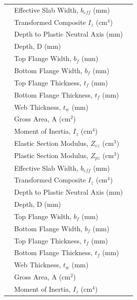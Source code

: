 \documentclass[12pt,a4paper]{report}
\numberwithin{table}{chapter}
\numberwithin{figure}{chapter}
\begin{document}
\begin{longtable}{|C{2.5cm}|L{8.0cm}|>{\centering\arraybackslash}p{5.0cm}|}
 & \textnormal{Effective Slab Width, $b_{eff}$ (mm)} &  \\[6pt]
 & \textnormal{Transformed Composite $I_z$ (cm$^4$)} &  \\[6pt]
 & \textnormal{Depth to Plastic Neutral Axis (mm)} &  \\[6pt]
\hline
{} & \textnormal{Depth, D (mm)} &  \\[6pt]
 & \textnormal{Top Flange Width, $b_f$ (mm)} &  \\[6pt]
 & \textnormal{Bottom Flange Width, $b_f$ (mm)} &  \\[6pt]
 & \textnormal{Top Flange Thickness, $t_f$ (mm)} &  \\[6pt]
 & \textnormal{Bottom Flange Thickness, $t_f$ (mm)} &  \\[6pt]
 & \textnormal{Web Thickness, $t_w$ (mm)} &  \\[6pt]
 & \textnormal{Gross Area, A (cm$^2$)} &  \\[6pt]
 & \textnormal{Moment of Inertia, $I_z$ (cm$^4$)} &  \\[6pt]
 & \textnormal{Elastic Section Modulus, $Z_{ez}$ (cm$^3$)} &  \\[6pt]
 & \textnormal{Plastic Section Modulus, $Z_{pz}$ (cm$^3$)} &  \\[6pt]
 & \textnormal{Effective Slab Width, $b_{eff}$ (mm)} &  \\[6pt]
 & \textnormal{Transformed Composite $I_z$ (cm$^4$)} &  \\[6pt]
 & \textnormal{Depth to Plastic Neutral Axis (mm)} &  \\[6pt]
\hline
{} & \textnormal{Depth, D (mm)} &  \\[6pt]
 & \textnormal{Top Flange Width, $b_f$ (mm)} &  \\[6pt]
 & \textnormal{Bottom Flange Width, $b_f$ (mm)} &  \\[6pt]
 & \textnormal{Top Flange Thickness, $t_f$ (mm)} &  \\[6pt]
 & \textnormal{Bottom Flange Thickness, $t_f$ (mm)} &  \\[6pt]
 & \textnormal{Web Thickness, $t_w$ (mm)} &  \\[6pt]
 & \textnormal{Gross Area, A (cm$^2$)} &  \\[6pt]
 & \textnormal{Moment of Inertia, $I_z$ (cm$^4$)} &  \\[6pt]

\end{longtable}
\end{document}
